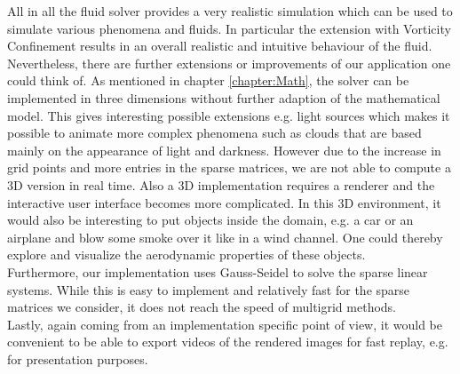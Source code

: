 \documentclass[a4paper,10pt,oneside,final,german,openbib,pdftex,titlepage]{scrbook}
\begin{document}
All in all the fluid solver provides a very realistic simulation which can be used to simulate various phenomena and fluids. In particular the extension with Vorticity Confinement results in an overall realistic and intuitive behaviour of the fluid.\\

Nevertheless, there are further extensions or improvements of our application one could think of. As mentioned in chapter \ref{chapter:Math}, the solver can be implemented in three dimensions without further adaption of the mathematical model. This gives interesting possible extensions e.g. light sources which makes it possible to animate more complex phenomena such as clouds that are based mainly on the appearance of light and darkness. However due to the increase in grid points and more entries in the sparse matrices, we are not able to compute a 3D version in real time. Also a 3D implementation requires a renderer and the interactive user interface becomes more complicated. In this 3D environment, it would also be interesting to put objects inside the domain, e.g. a car or an airplane and blow some smoke over it like in a wind channel. One could thereby explore and visualize the aerodynamic properties of these objects.\\

Furthermore, our implementation uses Gauss-Seidel to solve the sparse linear systems. While this is easy to implement and relatively fast for the sparse matrices we consider, it does not reach the speed of multigrid methods.\\

Lastly, again coming from an implementation specific point of view, it would be convenient to be able to export videos of the rendered images for fast replay, e.g. for presentation purposes.
%

\end{document}
